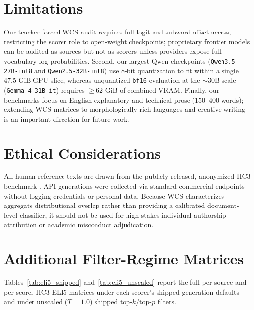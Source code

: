 \documentclass[11pt]{article}
\begin{document}
\section*{Limitations}
Our teacher-forced WCS audit requires full logit and subword offset access, restricting the scorer role to open-weight checkpoints; proprietary frontier models can be audited as sources but not as scorers unless providers expose full-vocabulary log-probabilities. Second, our largest Qwen checkpoints (\texttt{Qwen3.5-27B-int8} and \texttt{Qwen2.5-32B-int8}) use 8-bit quantization to fit within a single $47.5\text{ GiB}$ GPU slice, whereas unquantized \texttt{bf16} evaluation at the $\sim 30\text{B}$ scale (\texttt{Gemma-4-31B-it}) requires $\ge 62\text{ GiB}$ of combined VRAM. Finally, our benchmarks focus on English explanatory and technical prose ($150$--$400$ words); extending WCS matrices to morphologically rich languages and creative writing is an important direction for future work.

\section*{Ethical Considerations}
All human reference texts are drawn from the publicly released, anonymized HC3 benchmark \citep{guo2023hc3}. API generations were collected via standard commercial endpoints without logging credentials or personal data. Because WCS characterizes aggregate distributional overlap rather than providing a calibrated document-level classifier, it should not be used for high-stakes individual authorship attribution or academic misconduct adjudication.



\clearpage
\appendix

\section{Additional Filter-Regime Matrices}
\label{app:matrices}

Tables~\ref{tab:eli5_shipped} and~\ref{tab:eli5_unscaled} report the full per-source and per-scorer HC3 ELI5 matrices under each scorer's shipped generation defaults and under unscaled ($T=1.0$) shipped top-$k$/top-$p$ filters.
\end{document}

